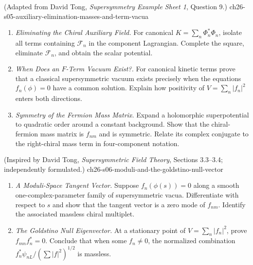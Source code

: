 \begin{enumerate}
    {(Adapted from David Tong, \emph{Supersymmetry Example Sheet 1}, Question 9.)}
    {ch26-s05-auxiliary-elimination-masses-and-term-vacua}
  \begin{enumerate}
    \item \emph{Eliminating the Chiral Auxiliary Field.}
    For canonical \(K=\sum_n\Phi_n^*\Phi_n\), isolate all terms containing
      \(\mathcal F_n\) in the component Lagrangian.  Complete the square,
      eliminate \(\mathcal F_n\), and obtain the scalar potential.
    \item \emph{When Does an \(F\)-Term Vacuum Exist?.}
    For canonical kinetic terms prove that a classical supersymmetric vacuum
      exists precisely when the equations \(f_n(\phi)=0\) have a common
      solution.  Explain how positivity of \(V=\sum_n|f_n|^2\) enters both
      directions.
    \item \emph{Symmetry of the Fermion Mass Matrix.}
    Expand a holomorphic superpotential to quadratic order around a constant
      background.  Show that the chiral-fermion mass matrix is \(f_{nm}\) and
      is symmetric.  Relate its complex conjugate to the right-chiral mass
      term in four-component notation.
  \end{enumerate}

    {(Inspired by David Tong, \emph{Supersymmetric Field Theory}, Sections 3.3--3.4; independently formulated.)}
    {ch26-s06-moduli-and-the-goldstino-null-vector}
  \begin{enumerate}
    \item \emph{A Moduli-Space Tangent Vector.}
    Suppose \(f_n(\phi(s))=0\) along a smooth one-complex-parameter family of
      supersymmetric vacua.  Differentiate with respect to \(s\) and show that
      the tangent vector is a zero mode of \(f_{nm}\).  Identify the associated
      massless chiral multiplet.
    \item \emph{The Goldstino Null Eigenvector.}
    At a stationary point of \(V=\sum_n|f_n|^2\), prove
      \(f_{mn}f_n^*=0\).  Conclude that when some \(f_n\ne0\), the normalized
      combination \(f_n^*\psi_{nL}/(\sum|f|^2)^{1/2}\) is massless.
  \end{enumerate}


\end{enumerate}
